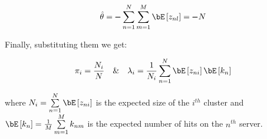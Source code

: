 \documentclass[a4paper,12pt]{article}
\begin{document}
\begin{mlsolution}
\begin{equation*}
    \hat{\theta} = \pmb{-}\sum\limits_{n=1}^N\sum\limits_{m=1}^M\bE\bs{z_{nl}} = \pmb{-}N
\end{equation*}

Finally, substituting them we get:

\begin{equation}
    \pi_i = \frac{N_i}{N} \quad \& \quad \lambda_i = \frac{1}{N_i}\sum\limits_{n=1}^N\bE\bs{z_{ni}}\bE\bs{k_n}
\end{equation}

where $N_i = \sum\limits_{n=1}^N\bE\bs{z_{ni}}$ is the expected size of the $i^{th}$ cluster and $\bE\bs{k_n} = \frac{1}{M}\sum\limits_{m=1}^M k_{nm}$ is the expected number of hits on the $n^{th}$ server.

\end{mlsolution}
\end{document}
